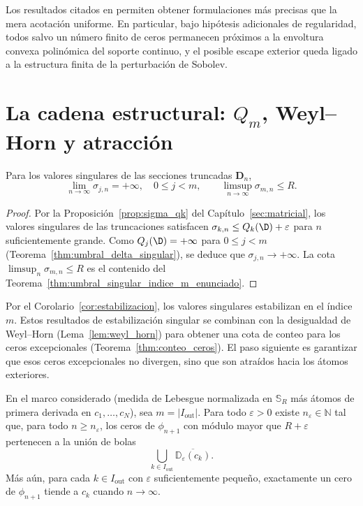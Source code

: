 \begin{rmk}
	Los resultados citados en \cite{lopez1999zero,lopez2001sobolev,marcellan2015sobolev} permiten obtener formulaciones más precisas que la mera acotación uniforme. En particular, bajo hipótesis adicionales de regularidad, todos salvo un número finito de ceros permanecen próximos a la envoltura convexa polinómica del soporte continuo, y el posible escape exterior queda ligado a la estructura finita de la perturbación de Sobolev.
\end{rmk}

\section{La cadena estructural: $Q_m$, Weyl--Horn y atracción}\label{sec:cadena_Qm}

\begin{cor}\label{cor:estabilizacion}
	Para los valores singulares de las secciones truncadas $\mathbf{D}_n$,
	\[
		\lim_{n\to\infty}\sigma_{j,n}=+\infty,\quad 0\le j<m,
		\qquad
		\limsup_{n\to\infty}\sigma_{m,n}\le R.
	\]
\end{cor}

\begin{proof}
	Por la Proposición~\ref{prop:sigma_qk} del Capítulo~\ref{sec:matricial}, los valores singulares de las truncaciones satisfacen $\sigma_{k,n}\le Q_k(\D)+\varepsilon$ para $n$ suficientemente grande. Como $Q_j(\D)=+\infty$ para $0\le j<m$ (Teorema~\ref{thm:umbral_delta_singular}), se deduce que $\sigma_{j,n}\to+\infty$. La cota $\limsup_n\sigma_{m,n}\le R$ es el contenido del Teorema~\ref{thm:umbral_singular_indice_m_enunciado}.
\end{proof}

Por el Corolario~\ref{cor:estabilizacion}, los valores singulares estabilizan en el índice $m$. Estos resultados de estabilización singular se combinan con la desigualdad de Weyl--Horn (Lema~\ref{lem:weyl_horn}) para obtener una cota de conteo para los ceros excepcionales (Teorema~\ref{thm:conteo_ceros}). El paso siguiente es garantizar que esos ceros excepcionales no divergen, sino que son atraídos hacia los átomos exteriores.

\begin{thm}\label{thm:atraccion}
	En el marco considerado (medida de Lebesgue normalizada en $\mathbb{S}_R$ más átomos de primera derivada en $c_1,\dots,c_N$), sea $m=|I_{\mathrm{out}}|$.
	Para todo $\varepsilon>0$ existe $n_\varepsilon\in\mathbb{N}$ tal que, para todo $n\ge n_\varepsilon$, los ceros de $\phi_{n+1}$ con módulo mayor que $R+\varepsilon$ pertenecen a la unión de bolas
	\[
		\bigcup_{k\in I_{\mathrm{out}}}\overline{\mathbb{D}_{\varepsilon}(c_k)}.
	\]
	Más aún, para cada $k\in I_{\mathrm{out}}$ con $\varepsilon$ suficientemente pequeño, exactamente un cero de $\phi_{n+1}$ tiende a $c_k$ cuando $n\to\infty$.
\end{thm}


